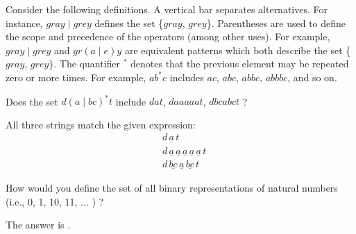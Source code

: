 \begin{question}
Consider the following definitions.  
A vertical bar separates alternatives. For instance, $gray  \mid grey$ defines the set \{$gray$, $grey$\}.
Parentheses are used to define the scope and precedence of the operators (among other uses). For example, $gray \mid grey$ and $gr(a\mid e)y$ are equivalent patterns which both describe the set 
 \{$gray$, $grey$\}.
The quantifier $^*$ denotes that the previous element may be repeated zero or more times. 
 For example, $ab^*c$ includes $ac$, $abc$, $abbc$, $abbbc$, and so on.

Does the set $d (a \mid bc)^*t  $ include $dat$, $daaaaat$, $dbcabct$ ?  

\begin{solution}
\begin{multiple-choice}
\end{multiple-choice}
\end{solution}
 
All three strings match the given expression:
\begin{align*}
&d \, \underline{a} \, t\\
&d \, \underline{a} \, \underline{a} \, \underline{a} \, \underline{a} \, \underline{a} \, t\\
&d \, \underline{bc} \, \underline{a} \, \underline{bc} \, t
\end{align*}

How would you define the set of all binary representations of natural numbers (i.e., 0, 1, 10, 11, ... ) ?

\begin{solution}
The answer is .
\end{solution}
\end{question}


